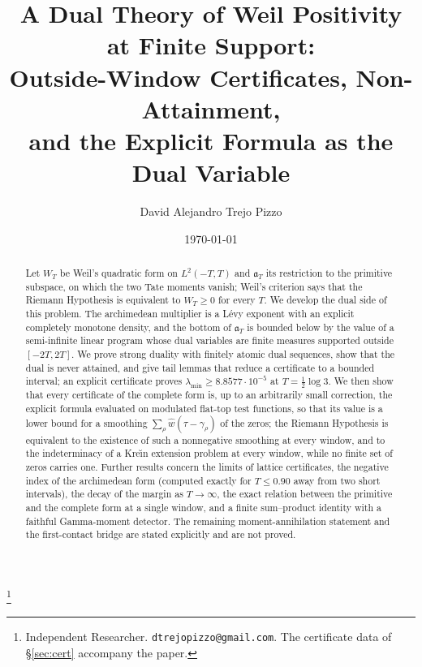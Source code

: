 \documentclass[11pt]{amsart}
\theoremstyle{definition}
\theoremstyle{remark}
\begin{document}
\title[A dual theory of Weil positivity at finite support]
{A Dual Theory of Weil Positivity at Finite Support:\\
Outside-Window Certificates, Non-Attainment,\\
and the Explicit Formula as the Dual Variable}

\author{David Alejandro Trejo Pizzo}
\thanks{Independent Researcher. \texttt{dtrejopizzo@gmail.com}. The certificate data of \S\ref{sec:cert} accompany the paper.}

\date{\today}


\begin{abstract}
Let $W_T$ be Weil's quadratic form on $L^2(-T,T)$ and $\mathfrak a_T$ its restriction to the
primitive subspace, on which the two Tate moments vanish; Weil's criterion says that the Riemann
Hypothesis is equivalent to $W_T\ge0$ for every $T$. We develop the dual side of this problem. The
archimedean multiplier is a L\'evy exponent with an explicit completely monotone density, and the
bottom of $\mathfrak a_T$ is bounded below by the value of a semi-infinite linear program whose dual
variables are finite measures supported outside $[-2T,2T]$. We prove strong duality with finitely
atomic dual sequences, show that the dual is never attained, and give tail lemmas that reduce a
certificate to a bounded interval; an explicit certificate proves $\lambda_{\min}\ge8.8577\cdot10^{-5}$
at $T=\frac12\log3$. We then show that every certificate of the complete form is, up to an arbitrarily
small correction, the explicit formula evaluated on modulated flat-top test functions, so that its
value is a lower bound for a smoothing $\sum_\rho\widehat w(\tau-\gamma_\rho)$ of the zeros; the
Riemann Hypothesis is equivalent to the existence of such a nonnegative smoothing at every window, and
to the indeterminacy of a Kre\u{\i}n extension problem at every window, while no finite set of zeros
carries one. Further results concern the limits of lattice certificates, the negative index of the
archimedean form (computed exactly for $T\le0.90$ away from two short intervals), the decay of the
margin as $T\to\infty$, the exact relation between the primitive and the complete form at a single
window, and a finite sum--product identity with a faithful Gamma-moment detector.  The remaining
moment-annihilation statement and the first-contact bridge are stated explicitly and are not proved.
\end{abstract}

\maketitle
\tableofcontents
\end{document}
